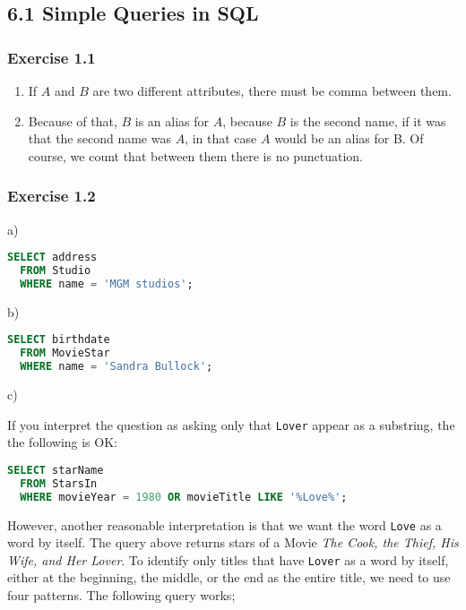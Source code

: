 \documentclass[../../main.tex]{subfiles}
\begin{document}
\subsection{6.1 Simple Queries in SQL}

\subsubsection*{Exercise 1.1}

\begin{enumerate}
  \item If $A$ and $B$ are two different attributes, there
        must be comma between them.
  \item Because of that, $B$ is an alias for $A$, because
        $B$ is the second name, if it was that the second
        name was $A$, in that case $A$ would be an alias
        for B. Of course, we count that between them there
        is no punctuation.
\end{enumerate}

\subsubsection*{Exercise 1.2}


a)

\begin{lstlisting}[language=sql]
  SELECT address
  FROM Studio
  WHERE name = 'MGM studios';
\end{lstlisting}

b)

\begin{lstlisting}[language=sql]
  SELECT birthdate
  FROM MovieStar
  WHERE name = 'Sandra Bullock';
\end{lstlisting}

\hypertarget{Solution6.1.2c}{c)}

If you interpret the question as asking only that \verb|Lover|
appear as a substring, the the following is OK:

\begin{lstlisting}[language=sql]
  SELECT starName
  FROM StarsIn
  WHERE movieYear = 1980 OR movieTitle LIKE '%Love%';
\end{lstlisting}

However, another reasonable interpretation is that we want
the word \verb|Love| as a word by itself. The query above
returns stars of a Movie \emph{The Cook, the Thief, His
Wife, and Her Lover}. To identify only titles that have
\verb|Lover| as a word by itself, either at the beginning,
the middle, or the end as the entire title, we need to use
four patterns. The following query works;
\end{document}
